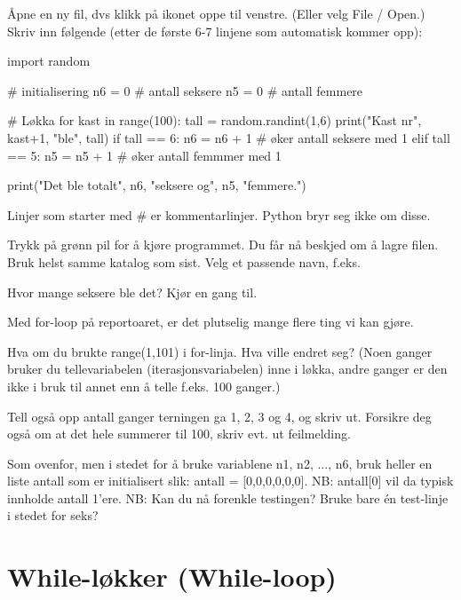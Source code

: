 {Åpne en ny fil, dvs klikk på ikonet oppe til venstre. (Eller velg File / Open.) Skriv inn følgende (etter de første 6-7 linjene som automatisk kommer opp): 

\begin{usncodebox}
import random

# initialisering
n6 = 0  # antall seksere
n5 = 0  # antall femmere

# Løkka 
for kast in range(100):
    tall = random.randint(1,6)
    print("Kast nr", kast+1, "ble", tall)
    if tall == 6:
       n6 = n6 + 1    # øker antall seksere med 1
    elif tall == 5:
       n5 = n5 + 1    # øker antall femmmer med 1

print("Det ble totalt", n6, "seksere og", n5, "femmere.")
\end{usncodebox}

Linjer som starter med \# er kommentarlinjer. Python bryr seg ikke om disse. 

Trykk på grønn pil for å kjøre programmet. Du får nå beskjed om å lagre filen. Bruk helst samme katalog som sist. Velg et passende navn, f.eks. 

Hvor mange seksere ble det? Kjør en gang til.

Med for-loop på reportoaret, er det plutselig mange flere ting vi kan gjøre. 

\begin{question}
Hva om du brukte range(1,101) i for-linja. Hva ville endret seg? (Noen ganger bruker du tellevariabelen (iterasjonsvariabelen) inne i løkka, andre ganger er den ikke i bruk til annet enn å telle f.eks. 100 ganger.)
\end{question}

\begin{question}
Tell også opp antall ganger terningen ga 1, 2, 3 og 4, og skriv ut.
Forsikre deg også om at det hele summerer til 100, skriv evt. ut feilmelding.
\end{question}

\begin{question}
Som ovenfor, men i stedet for å bruke variablene n1, n2, ..., n6, bruk heller en liste antall som er initialisert slik: antall = [0,0,0,0,0,0]. NB: antall[0] vil da typisk innholde antall 1'ere. NB: Kan du nå forenkle testingen? Bruke bare én test-linje i stedet for seks? 
\end{question}

\section{While-løkker (While-loop)}

}
